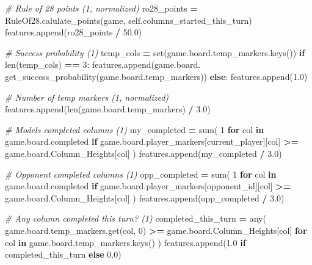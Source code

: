 \documentclass[12pt]{article}
\newenvironment{Shaded}{\begin{snugshade}}{\end{snugshade}}
\newcommand{\BuiltInTok}[1]{#1}
\newcommand{\CommentTok}[1]{\textcolor[rgb]{0.56,0.35,0.01}{\textit{#1}}}
\newcommand{\ControlFlowTok}[1]{\textcolor[rgb]{0.13,0.29,0.53}{\textbf{#1}}}
\newcommand{\DecValTok}[1]{\textcolor[rgb]{0.00,0.00,0.81}{#1}}
\newcommand{\FloatTok}[1]{\textcolor[rgb]{0.00,0.00,0.81}{#1}}
\newcommand{\KeywordTok}[1]{\textcolor[rgb]{0.13,0.29,0.53}{\textbf{#1}}}
\newcommand{\NormalTok}[1]{#1}
\newcommand{\OperatorTok}[1]{\textcolor[rgb]{0.81,0.36,0.00}{\textbf{#1}}}
\newcommand{\VariableTok}[1]{\textcolor[rgb]{0.00,0.00,0.00}{#1}}
\begin{document}
\begin{thesis}
\begin{Shaded}
\begin{Highlighting}[]
        \CommentTok{\# Rule of 28 points (1, normalized)}
\NormalTok{        ro28\_points }\OperatorTok{=}\NormalTok{ RuleOf28.calulate\_points(game, }
                                              \VariableTok{self}\NormalTok{.columns\_started\_this\_turn)}
\NormalTok{        features.append(ro28\_points }\OperatorTok{/} \FloatTok{50.0}\NormalTok{)}
        
        \CommentTok{\# Success probability (1)}
\NormalTok{        temp\_cols }\OperatorTok{=} \BuiltInTok{set}\NormalTok{(game.board.temp\_markers.keys())}
        \ControlFlowTok{if} \BuiltInTok{len}\NormalTok{(temp\_cols) }\OperatorTok{==} \DecValTok{3}\NormalTok{:}
\NormalTok{            features.append(game.board.}
\NormalTok{                            get\_success\_probability(game.board.temp\_markers))}
        \ControlFlowTok{else}\NormalTok{:}
\NormalTok{            features.append(}\FloatTok{1.0}\NormalTok{)}
        
        \CommentTok{\# Number of temp markers (1, normalized)}
\NormalTok{        features.append(}\BuiltInTok{len}\NormalTok{(game.board.temp\_markers) }\OperatorTok{/} \FloatTok{3.0}\NormalTok{)}
        
        \CommentTok{\# Model\textquotesingle{}s completed columns (1)}
\NormalTok{        my\_completed }\OperatorTok{=} \BuiltInTok{sum}\NormalTok{(}
            \DecValTok{1} \ControlFlowTok{for}\NormalTok{ col }\KeywordTok{in}\NormalTok{ game.board.completed}
            \ControlFlowTok{if}\NormalTok{ game.board.player\_markers[current\_player][col] }\OperatorTok{\textgreater{}=} 
\NormalTok{                                              game.board.Column\_Heights[col]}
\NormalTok{        )}
\NormalTok{        features.append(my\_completed }\OperatorTok{/} \FloatTok{3.0}\NormalTok{)}
        
        \CommentTok{\# Opponent completed columns (1)}
\NormalTok{        opp\_completed }\OperatorTok{=} \BuiltInTok{sum}\NormalTok{(}
            \DecValTok{1} \ControlFlowTok{for}\NormalTok{ col }\KeywordTok{in}\NormalTok{ game.board.completed}
            \ControlFlowTok{if}\NormalTok{ game.board.player\_markers[opponent\_id][col] }\OperatorTok{\textgreater{}=} 
\NormalTok{                                              game.board.Column\_Heights[col]}
\NormalTok{        )}
\NormalTok{        features.append(opp\_completed }\OperatorTok{/} \FloatTok{3.0}\NormalTok{)}
        
        \CommentTok{\# Any column completed this turn? (1)}
\NormalTok{        completed\_this\_turn }\OperatorTok{=} \BuiltInTok{any}\NormalTok{(}
\NormalTok{            game.board.temp\_markers.get(col, }\DecValTok{0}\NormalTok{) }\OperatorTok{\textgreater{}=} 
\NormalTok{                                              game.board.Column\_Heights[col]}
            \ControlFlowTok{for}\NormalTok{ col }\KeywordTok{in}\NormalTok{ game.board.temp\_markers.keys()}
\NormalTok{        )}
\NormalTok{        features.append(}\FloatTok{1.0} \ControlFlowTok{if}\NormalTok{ completed\_this\_turn }\ControlFlowTok{else} \FloatTok{0.0}\NormalTok{)}
        

\end{Highlighting}
\end{Shaded}
\end{thesis}
\end{document}
